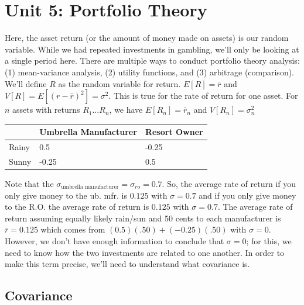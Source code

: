 \documentclass[11pt]{article}
\theoremstyle{definition}
\begin{document}
\section{Unit 5: Portfolio Theory}
Here, the asset return (or the amount of money made on assets) is our random variable. While we had repeated investments in gambling, we'll only be looking at a single period here. There are multiple ways to conduct portfolio theory analysis: (1) mean-variance analysis, (2) utility functions, and (3) arbitrage (comparison). \\

\noindent We'll define $R$ as the random variable for return. $E[R] = \bar{r}$ and $V[R] = E[(r - \bar{r})^2] = \sigma^2$. This is true for the rate of return for one asset. For $n$ assets with returns $R_1 \dots R_n$, we have $E[R_n] = \bar{r}_n$ and $V[R_n] = \sigma_n^2$
\begin{table}[h]
\centering
\begin{tabular}{@{}lll@{}}
\toprule
      & Umbrella Manufacturer & Resort Owner \\ \midrule
Rainy & 0.5                   & -0.25        \\
Sunny & -0.25                 & 0.5          \\ \bottomrule
\end{tabular}
\end{table}

Note that the $\sigma_{\text {umbrella manufacturer}} = \sigma_{ro} = 0.7$. So, the average rate of return if you only give money to the ub. mfr. is $0.125$ with $\sigma = 0.7$ and if you only give money to the R.O. the average rate of return is $0.125$ with $\sigma = 0.7$. The average rate of return assuming equally likely rain/sun and 50 cents to each manufacturer is $\bar{r} = 0.125$ which comes from $(0.5)(.50) + (-0.25)(.50)$ with $\sigma = 0$. However, we don't have enough information to conclude that $\sigma = 0$; for this, we need to know how the two investments are related to one another. In order to make this term precise, we'll need to understand what covariance is.

\subsection{Covariance}
\end{document}

